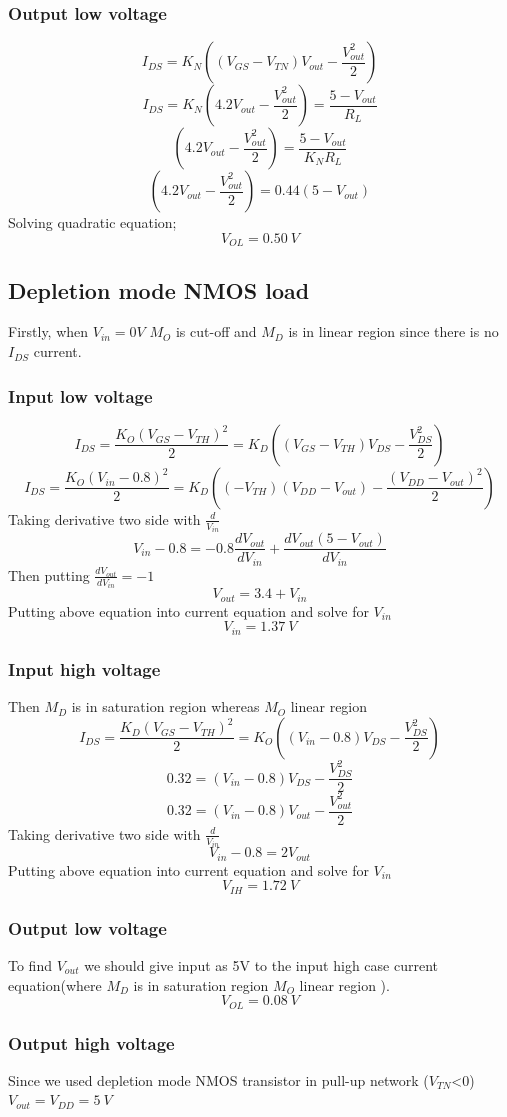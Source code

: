 \documentclass[11 pt]{article}
\begin{document}
\subsubsection*{Output low voltage}
\[I_{DS}=K_N((V_{GS}-V_{TN})V_{out}-\frac{V_{out}^2}{2})\]
\[I_{DS}=K_N(4.2V_{out}-\frac{V_{out}^2}{2})=\frac{5-V_{out}}{R_L}\]
\[(4.2V_{out}-\frac{V_{out}^2}{2})=\frac{5-V_{out}}{K_NR_L}\]
\[(4.2V_{out}-\frac{V_{out}^2}{2})=0.44(5-V_{out})\]
Solving quadratic equation;
\[V_{OL}=0.50\>V\]
\subsection*{Depletion mode NMOS load}
Firstly, when $V_{in}=0V$ $M_O$ is cut-off and $M_D$ is in linear region since there is no $I_{DS}$ current.
\subsubsection*{Input low voltage}
\[I_{DS}=\frac{K_O(V_{GS}-V_{TH})^2}{2}=K_D((V_{GS}-V_{TH})V_{DS}-\frac{V_{DS}^2}{2})\]
\[I_{DS}=\frac{K_O(V_{in}-0.8)^2}{2}=K_D((-V_{TH})(V_{DD}-V_{out})-\frac{(V_{DD}-V_{out})^2}{2})\]
Taking derivative two side with $\frac{d}{V_{in}}$
\[V_{in}-0.8=-0.8\frac{dV_{out}}{dV_{in}}+\frac{dV_{out}(5-V_{out})}{dV_{in}}\]
Then putting $\frac{dV_{out}}{dV_{in}}=-1$
\[V_{out}=3.4+V_{in}\]
Putting above equation into current equation and solve for $V_{in}$ 
\[V_{in}=1.37 \> V\]
\subsubsection*{Input high voltage}
Then $M_D$ is in saturation region whereas $M_O$ linear region 
\[I_{DS}=\frac{K_D(V_{GS}-V_{TH})^2}{2}=K_O((V_{in}-0.8)V_{DS}-\frac{V_{DS}^2}{2})\]
\[0.32=(V_{in}-0.8)V_{DS}-\frac{V_{DS}^2}{2}\]
\[0.32=(V_{in}-0.8)V_{out}-\frac{V_{out}^2}{2}\]
Taking derivative two side with $\frac{d}{V_{in}}$
\[V_{in}-0.8=2V_{out}\]
Putting above equation into current equation and solve for $V_{in}$
\[V_{IH}=1.72 \>V\]

\subsubsection*{Output low voltage}
To find $V_{out}$ we should give input as 5V to the input high case current equation(where $M_D$ is in saturation region $M_O$ linear region ).
\[V_{OL}=0.08 \>V\]

\subsubsection*{Output high voltage}
Since we used depletion mode NMOS transistor in pull-up network ($V_{TN}$<0) $V_{out}=V_{DD}=5\> V$
\end{document}
